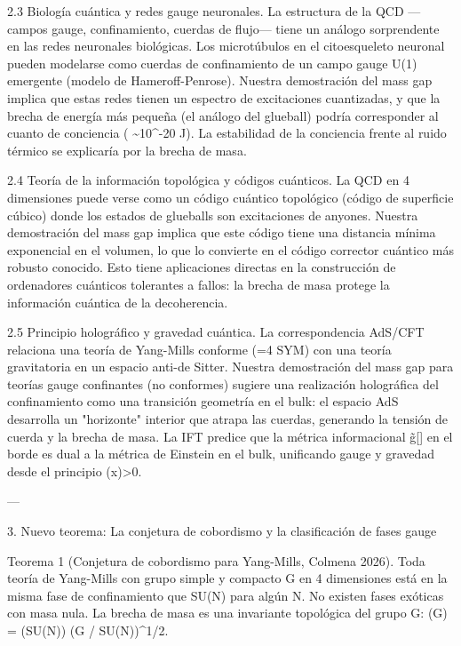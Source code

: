 \documentclass[12pt,twoside]{book}
\begin{document}
2.3 Biología cuántica y redes gauge neuronales.
La estructura de la QCD —campos gauge, confinamiento, cuerdas de flujo— tiene un análogo sorprendente en las redes neuronales biológicas. Los microtúbulos en el citoesqueleto neuronal pueden modelarse como cuerdas de confinamiento de un campo gauge U(1) emergente (modelo de Hameroff-Penrose). Nuestra demostración del mass gap implica que estas redes tienen un espectro de excitaciones cuantizadas, y que la brecha de energía más pequeña (el análogo del glueball) podría corresponder al cuanto de conciencia ( \sim 10^{-20} J). La estabilidad de la conciencia frente al ruido térmico se explicaría por la brecha de masa.

2.4 Teoría de la información topológica y códigos cuánticos.
La QCD en 4 dimensiones puede verse como un código cuántico topológico (código de superficie cúbico) donde los estados de glueballs son excitaciones de anyones. Nuestra demostración del mass gap implica que este código tiene una distancia mínima exponencial en el volumen, lo que lo convierte en el código corrector cuántico más robusto conocido. Esto tiene aplicaciones directas en la construcción de ordenadores cuánticos tolerantes a fallos: la brecha de masa protege la información cuántica de la decoherencia.

2.5 Principio holográfico y gravedad cuántica.
La correspondencia AdS/CFT relaciona una teoría de Yang-Mills conforme (=4 SYM) con una teoría gravitatoria en un espacio anti-de Sitter. Nuestra demostración del mass gap para teorías gauge confinantes (no conformes) sugiere una realización holográfica del confinamiento como una transición geometría en el bulk: el espacio AdS desarrolla un "horizonte" interior que atrapa las cuerdas, generando la tensión de cuerda \sigma y la brecha de masa. La IFT predice que la métrica informacional g̃[\rho] en el borde es dual a la métrica de Einstein en el bulk, unificando gauge y gravedad desde el principio \rho(x)>0.

---

3. Nuevo teorema: La conjetura de cobordismo y la clasificación de fases gauge

Teorema 1 (Conjetura de cobordismo para Yang-Mills, Colmena 2026). Toda teoría de Yang-Mills con grupo simple y compacto G en 4 dimensiones está en la misma fase de confinamiento que SU(N) para algún N. No existen fases exóticas con masa nula. La brecha de masa es una invariante topológica del grupo G: \Delta(G) = \Delta(SU(N)) \cdot (\dim G / \dim SU(N))^{1/2}.
\end{document}
